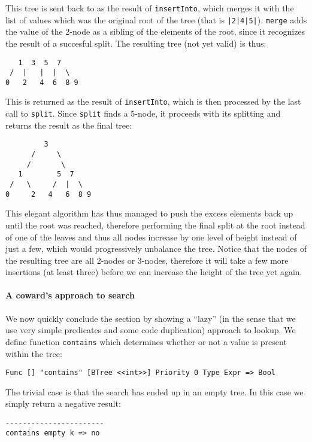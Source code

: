 This tree is sent back to as the result of \texttt{insertInto}, which merges it with the list of values which was the original root of the tree (that is \texttt{|2|4|5|}). \texttt{merge} adds the value of the 2-node as a sibling of the elements of the root, since it recognizes the result of a succesful split. The resulting tree (not yet valid) is thus:

\begin{lstlisting}
   1  3  5  7
 /  |   |  |  \
0   2   4  6  8 9
\end{lstlisting}

This is returned as the result of \texttt{insertInto}, which is then processed by the last call to \texttt{split}. Since \texttt{split} finds a 5-node, it proceeds with its splitting and returns the result as the final tree:

\begin{lstlisting}
         3
      /     \
     /       \
   1        5  7
 /   \     /  |  \
0     2   4   6  8 9
\end{lstlisting}

This elegant algorithm has thus managed to push the excess elements back up until the root was reached, therefore performing the final split at the root instead of one of the leaves and thus all nodes increase by one level of height instead of just a few, which would progressively unbalance the tree. Notice that the nodes of the resulting tree are all 2-nodes or 3-nodes, therefore it will take a few more insertions (at least three) before we can increase the height of the tree yet again.


\paragraph{A coward's approach to search}
We now quickly conclude the section by showing a ``lazy'' (in the sense that we use very simple predicates and some code duplication) approach to lookup. We define function \texttt{contains} which determines whether or not a value is present within the tree:

\begin{lstlisting}
Func [] "contains" [BTree <<int>>] Priority 0 Type Expr => Bool
\end{lstlisting}

The trivial case is that the search has ended up in an empty tree. In this case we simply return a negative result:

\begin{lstlisting}
-----------------------
contains empty k => no
\end{lstlisting}

